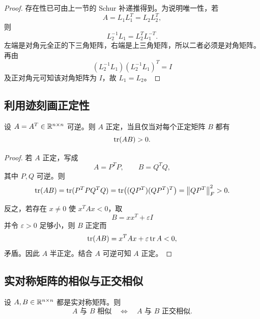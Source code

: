 \begin{proof}
存在性已可由上一节的 Schur 补递推得到。为说明唯一性，若
\begin{equation}
 A=L_1L_1^T=L_2L_2^T,
\end{equation}
则
\begin{equation}
 L_2^{-1}L_1=L_2^TL_1^{-T}.
\end{equation}
左端是对角元全正的下三角矩阵，右端是上三角矩阵，所以二者必须是对角矩阵。再由
\begin{equation}
 (L_2^{-1}L_1)(L_2^{-1}L_1)^T=I
\end{equation}
及正对角元可知该对角矩阵为 $I$，故 $L_1=L_2$。
\end{proof}

\subsection{利用迹刻画正定性}

\begin{theorem}
设 $A=A^T\in\mathbb R^{n\times n}$ 可逆。则 $A$ 正定，当且仅当对每个正定矩阵 $B$ 都有
\begin{equation}
 \operatorname{tr}(AB)>0.
\end{equation}
\end{theorem}

\begin{proof}
若 $A$ 正定，写成
\begin{equation}
 A=P^TP,
 \qquad B=Q^TQ,
\end{equation}
其中 $P,Q$ 可逆。则
\begin{equation}
 \operatorname{tr}(AB)=\operatorname{tr}(P^TPQ^TQ)
 =\operatorname{tr}\bigl((QP^T)(QP^T)^T\bigr)
 =\left\lVert QP^T\right\rVert_F^2>0.
\end{equation}

反之，若存在 $x\neq0$ 使 $x^TAx<0$，取
\begin{equation}
 B=xx^T+\varepsilon I
\end{equation}
并令 $\varepsilon>0$ 足够小，则 $B$ 正定而
\begin{equation}
 \operatorname{tr}(AB)=x^TAx+\varepsilon\operatorname{tr} A<0,
\end{equation}
矛盾。因此 $A$ 半正定。结合 $A$ 可逆可知 $A$ 正定。
\end{proof}

\subsection{实对称矩阵的相似与正交相似}

\begin{theorem}
设 $A,B\in\mathbb R^{n\times n}$ 都是实对称矩阵。则
\begin{equation}
 A\text{ 与 }B\text{ 相似}
 \quad\Longleftrightarrow\quad
 A\text{ 与 }B\text{ 正交相似}.
\end{equation}
\end{theorem}

